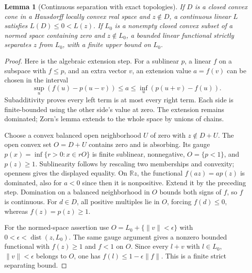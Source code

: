 \documentclass[11pt]{article}
\newtheorem{lemma}[theorem]{Lemma}
\newcommand{\R}{\mathbb R}\newcommand{\Q}{\mathbb Q}\newcommand{\Z}{\mathbb Z}
\begin{document}
\begin{lemma}[Continuous separation with exact topologies]\label{l:hb}
If $D$ is a closed convex cone in a Hausdorff locally convex real space and $z\notin D$, a continuous linear $L$ satisfies $L(D)\leq0<L(z)$. If $L_0$ is a nonempty closed convex subset of a normed space containing zero and $z\notin L_0$, a bounded linear functional strictly separates $z$ from $L_0$, with a finite upper bound on $L_0$.
\end{lemma}
\begin{proof}
Here is the algebraic extension step. For a sublinear $p$, a linear $f$ on a subspace with $f\leq p$, and an extra vector $v$, an extension value $a=f(v)$ can be chosen in the interval
\[
 \sup_u(f(u)-p(u-v))\leq a\leq\inf_u(p(u+v)-f(u)).
\]
Subadditivity proves every left term is at most every right term. Each side is finite-bounded using the other side's value at zero. The extension remains dominated; Zorn's lemma extends to the whole space by unions of chains.

Choose a convex balanced open neighborhood $U$ of zero with $z\notin D+U$. The open convex set $O=D+U$ contains zero and is absorbing. Its gauge $p(x)=\inf\{r>0:x\in rO\}$ is finite sublinear, nonnegative, $O=\{p<1\}$, and $p(z)\geq1$. Sublinearity follows by rescaling two memberships and convexity; openness gives the displayed equality. On $\R z$, the functional $f(az)=a p(z)$ is dominated, also for $a<0$ since then it is nonpositive. Extend it by the preceding step. Domination on a balanced neighborhood in $O$ bounds both signs of $f$, so $f$ is continuous. For $d\in D$, all positive multiples lie in $O$, forcing $f(d)\leq0$, whereas $f(z)=p(z)\geq1$.

For the normed-space assertion use $O=L_0+\{\|v\|<\epsilon\}$ with $0<\epsilon<\operatorname{dist}(z,L_0)$. The same gauge argument gives a nonzero bounded functional with $f(z)\geq1$ and $f<1$ on $O$. Since every $l+v$ with $l\in L_0$, $\|v\|<\epsilon$ belongs to $O$, one has $f(l)\leq1-\epsilon\|f\|$. This is a finite strict separating bound.
\end{proof}
\end{document}
